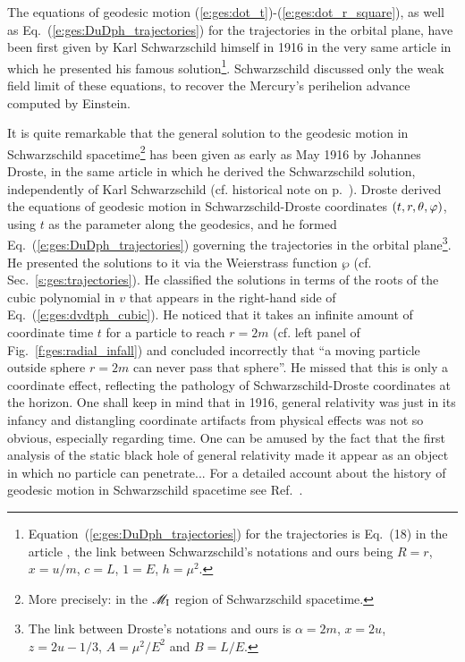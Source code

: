 \begin{hist}
The equations of geodesic motion (\ref{e:ges:dot_t})-(\ref{e:ges:dot_r_square}),
as well as Eq.~(\ref{e:ges:DuDph_trajectories}) for the trajectories in the
orbital plane, have been first given by Karl Schwarzschild
himself in 1916 in the very same article \cite{Schwa1916} in which he presented
his famous solution\footnote{Equation~(\ref{e:ges:DuDph_trajectories}) for the
trajectories is Eq.~(18) in the article \cite{Schwa1916}, the
link between Schwarzschild's notations and ours being $R=r$, $x=u/m$, $c=L$,
$1=E$, $h=\mu^2$.}. Schwarzschild discussed only the weak field limit of these
equations, to recover the Mercury's perihelion advance computed by
Einstein.

It is quite remarkable that the general solution to the geodesic motion
in Schwarzschild spacetime\footnote{More precisely: in the $\mathscr{M}_{\rm I}$ region
of Schwarzschild spacetime.} has been given as early as May 1916 by
Johannes Droste, in the same article \cite{Drost1917} in which
he derived the Schwarzschild solution, independently of Karl Schwarzschild
(cf. historical note on p.~\pageref{h:sch:Schwarzschild_sol}).
Droste derived the equations of geodesic motion in Schwarzschild-Droste coordinates
$(t, r, \theta,\varphi)$, using $t$ as the parameter
along the geodesics, and he formed Eq.~(\ref{e:ges:DuDph_trajectories}) governing
the trajectories in the orbital plane\footnote{The link between Droste's notations
and ours is $\alpha=2m$, $x=2u$, $z = 2u - 1/3$, $A = \mu^2/E^2$ and $B= L/E$.}.
He presented the solutions to it
via the Weierstrass function $\wp$ (cf. Sec.~\ref{s:ges:trajectories}).
He classified the solutions in terms of the roots of the cubic polynomial
in $v$ that appears in the right-hand side of Eq.~(\ref{e:ges:dvdtph_cubic}).
He noticed that it takes an infinite amount of coordinate time $t$ for a particle
to reach $r=2m$ (cf. left panel of Fig.~\ref{f:ges:radial_infall}) and
concluded incorrectly that ``a moving particle outside sphere $r=2m$ can
never pass that sphere''. He missed that this is only a coordinate effect,
reflecting the pathology of Schwarzschild-Droste coordinates at the horizon.
One shall keep in mind that in 1916, general relativity was just in its infancy
and distangling coordinate artifacts from physical effects was not so obvious,
especially regarding time.
One can be amused by the fact that the first analysis of the static
black hole of general relativity made it appear as an object in which no particle
can penetrate...
For a detailed account about the history of geodesic motion in
Schwarzschild spacetime see Ref.~\cite{Eisen87}.
\end{hist}








